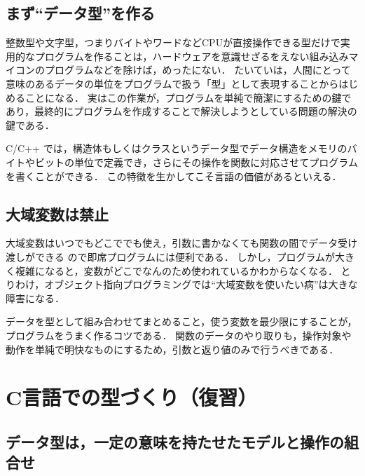 \documentclass[11pt,a4,epsf]{jarticle}
\begin{document}
\subsection{まず``データ型''を作る}

整数型や文字型，つまりバイトやワードなどCPUが直接操作できる型だけで実用的なプログラムを作ることは，ハードウェアを意識せざるをえない組み込みマイコンのプログラムなどを除けば，めったにない．
たいていは，人間にとって意味のあるデータの単位をプログラムで扱う「型」として表現することからはじめることになる．
実はこの作業が，プログラムを単純で簡潔にするための鍵であり，最終的にプログラムを作成することで解決しようとしている問題の解決の鍵である．

C/C++ では，構造体もしくはクラスというデータ型でデータ構造をメモリのバイトやビットの単位で定義でき，さらにその操作を関数に対応させてプログラムを書くことができる．
この特徴を生かしてこそ言語の価値があるといえる．



\subsection{大域変数は禁止}

大域変数はいつでもどこででも使え，引数に書かなくても関数の間でデータ受け渡しができる
ので即席プログラムには便利である．
しかし，プログラムが大きく複雑になると，変数がどこでなんのため使われているかわからなくなる．
とりわけ，オブジェクト指向プログラミングでは``大域変数を使いたい病''は大きな障害になる．

データを型として組み合わせてまとめること，使う変数を最少限にすることが，
プログラムをうまく作るコツである．
関数のデータのやり取りも，操作対象や動作を単純で明快なものにするため，引数と返り値のみで行うべきである．



\section{C言語での型づくり（復習）}

\subsection{データ型は，一定の意味を持たせたモデルと操作の組合せ} %
\end{document}
